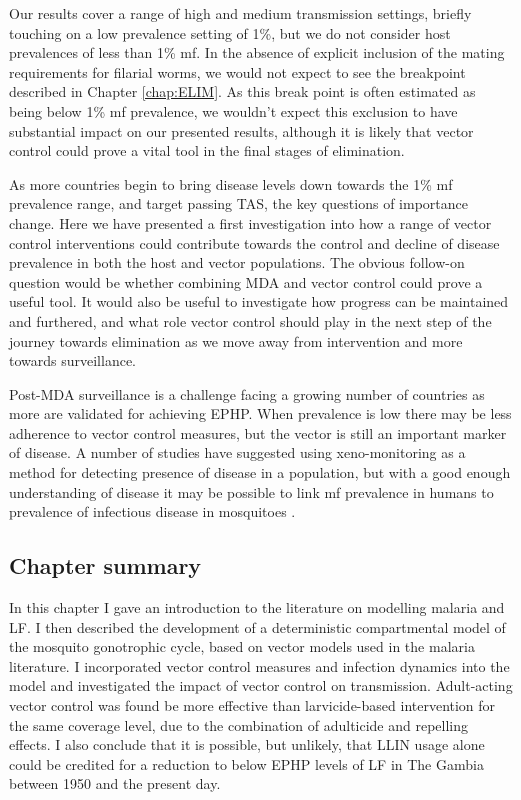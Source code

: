 Our results cover a range of high and medium transmission settings, briefly touching on a low prevalence setting of 1\%, but we do not consider host prevalences of less than 1\% mf. In the absence of explicit inclusion of the mating requirements for filarial worms, we would not expect to see the breakpoint described in Chapter \ref{chap:ELIM}. As this break point is often estimated as being below 1\% mf prevalence, we wouldn't expect this exclusion to have substantial impact on our presented results, although it is likely that vector control could prove a vital tool in the final stages of elimination.

As more countries begin to bring disease levels down towards the 1\% mf prevalence range, and target passing TAS, the key questions of importance change. Here we have presented a first investigation into how a range of vector control interventions could contribute towards the control and decline of disease prevalence in both the host and vector populations. The obvious follow-on question would be whether combining MDA and vector control could prove a useful tool. It would also be useful to investigate how progress can be maintained and furthered, and what role vector control should play in the next step of the journey towards elimination as we move away from intervention and more towards surveillance.

Post-MDA surveillance is a challenge facing a growing number of countries as more are validated for achieving EPHP. When prevalence is low there may be less adherence to vector control measures, but the vector is still an important marker of disease. A number of studies have suggested using xeno-monitoring as a method for detecting presence of disease in a population, but with a good enough understanding of disease it may be possible to link mf prevalence in humans to prevalence of infectious disease in mosquitoes \cite{Opoku2018,Pilotte2016}.

\subsection{Chapter summary}

In this chapter I gave an introduction to the literature on modelling malaria and LF. I then described the development of a deterministic compartmental model of the mosquito gonotrophic cycle, based on vector models used in the malaria literature. I incorporated vector control measures and infection dynamics into the model and investigated the impact of vector control on transmission. Adult-acting vector control was found be more effective than larvicide-based intervention for the same coverage level, due to the combination of adulticide and repelling effects. I also conclude that it is possible, but unlikely, that LLIN usage alone could be credited for a reduction to below EPHP levels of LF in The Gambia between 1950 and the present day.


